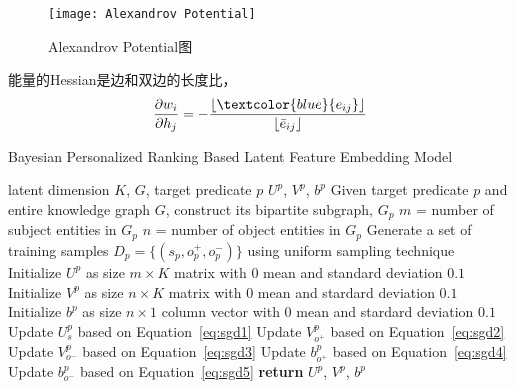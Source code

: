 \begin{figure}[h]
    \centering
    \texttt{[image: Alexandrov Potential]}
    \caption{Alexandrov Potential图}
    \label{fig:Alexandrov Potential}
\end{figure}

能量的Hessian是边和双边的长度比，
\begin{equation*}
    \frac{\partial w_i}{\partial h_j} = -\frac{\left \lfloor \textcolor{blue}{ e_{ij}} \right \rfloor }{\left \lfloor \bar{e}_{ij}  \right \rfloor } 
    \label{equ:Alexandrov}
\end{equation*}

\begin{algorithm}
	\renewcommand{\algorithmicrequire}{\textbf{Input:}}
	\renewcommand{\algorithmicensure}{\textbf{Output:}}
	\caption{Bayesian Personalized Ranking Based Latent Feature Embedding Model}
	\label{alg:1}
	\begin{algorithmic}[1]
		\REQUIRE latent dimension $K$, $G$, target predicate $p$
		\ENSURE $U^{p}$, $V^{p}$, $b^{p}$
		\STATE Given target predicate $p$ and entire knowledge graph $G$, construct its bipartite subgraph, $G_{p}$ 
		\STATE $m$ = number of subject entities in $G_{p}$
		\STATE $n$ = number of object entities in $G_{p}$ 
		\STATE Generate a set of training samples $D_{p} = \{(s_p, o^{+}_{p}, o^{-}_{p})\}$ using uniform sampling technique
		\STATE Initialize $U^{p}$ as size $m \times K$ matrix with $0$ mean and standard deviation $0.1$
		\STATE Initialize $V^{p}$ as size $n \times K$ matrix with $0$ mean and stardard deviation $0.1$
		\STATE Initialize $b^{p}$ as size $n \times 1$ column vector with $0$ mean and stardard deviation $0.1$
		\STATE Update $U_{s}^{p}$ based on Equation~\ref{eq:sgd1}
		\STATE Update $V_{o^{+}}^{p}$ based on Equation~\ref{eq:sgd2}
		\STATE Update $V_{o^{-}}^{p}$ based on Equation~\ref{eq:sgd3}
		\STATE Update $b_{o^{+}}^{p}$ based on Equation~\ref{eq:sgd4}
		\STATE Update $b_{o^{-}}^{p}$ based on Equation~\ref{eq:sgd5}
		\ENDFOR
		\STATE \textbf{return} $U^{p}$, $V^{p}$, $b^{p}$
	\end{algorithmic}  
\end{algorithm}

